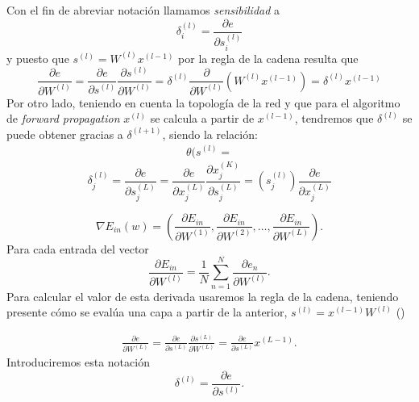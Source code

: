 Con el fin de abreviar notación llamamos \textit{sensibilidad} a
\begin{equation}
    \delta^{(l)}_i = \frac{\partial e}{\partial s^{(l)}_i}
\end{equation}
y puesto que $s^{(l)} = W^{(l)}x^{(l-1)}$
por la regla de la cadena resulta que 
\begin{equation}
    \frac{\partial e}{\partial W^{(l)}} 
    = %
    \frac{\partial e}{\partial s^{(l)}}
    \frac{\partial s^{(l)}}{\partial W^{(l)}}
    = %
    \delta^{(l)}
    \frac{\partial }{\partial W^{(l)}}
    \left( W^{(l)} x^{(l-1)}\right)     
     = 
     \delta^{(l)}  x^{(l-1)}
\end{equation}
Por otro lado, teniendo en cuenta la topología de la red y que para 
el algoritmo de \textit{forward propagation} $x^{(l)}$ se calcula 
a partir de $x^{(l-1)}$, tendremos que $\delta^{(l)}$ se puede obtener gracias a $\delta^{(l+1)}$, siendo la relación: 
\begin{align}
    \theta(s^{(l)}
    = 
\end{align}
\begin{equation}
    \delta_j^{(l)}
    =
    \frac{\partial e}{\partial s^{(L)}_j}
    = %
    \frac{\partial e}{\partial x^{(L)}_j}
    \frac{\partial x^{(K)}_j}{\partial s^{(L)}_j}
    = %
    \left( s^{(l)}_j \right)
    \frac{\partial e}{\partial x^{(L)}_j}
\end{equation}

\begin{equation}
    \nabla E_{in}(w) = 
    \left( 
        \frac{\partial E_{in}}{\partial W^{(1)}}, 
        \frac{\partial E_{in}}{\partial W^{(2)}},
        \ldots,
        \frac{\partial E_{in}}{\partial W^{(L)}}
    \right).
\end{equation}
Para cada entrada del vector
\begin{equation}
    \frac{\partial E_{in}}{\partial W^{(l)}}
    = \frac{1}{N} 
    \sum_{n=1}^N  \frac{\partial e_{n}}{\partial W^{(l)}}.
\end{equation}
Para calcular el valor de esta derivada usaremos la regla de la cadena, teniendo presente cómo se evalúa una capa a partir de la anterior,  $s^{(l)} = x^{(l-1)}W^{(l)}$ ()

\begin{align}
    \frac{\partial e}{\partial W^{(L)}} 
    = 
    \frac{\partial e}{\partial s^{(L)}} 
    \frac{\partial s^{(L)}}{\partial W^{(L)}}
    = 
    \frac{\partial e}{\partial s^{(L)}} 
    x^{(L-1)}. 
\end{align}
Introduciremos esta notación 
\begin{equation}
    \delta^{(l)}
    =
    \frac{\partial e}{\partial s^{(l)}}.
\end{equation}

